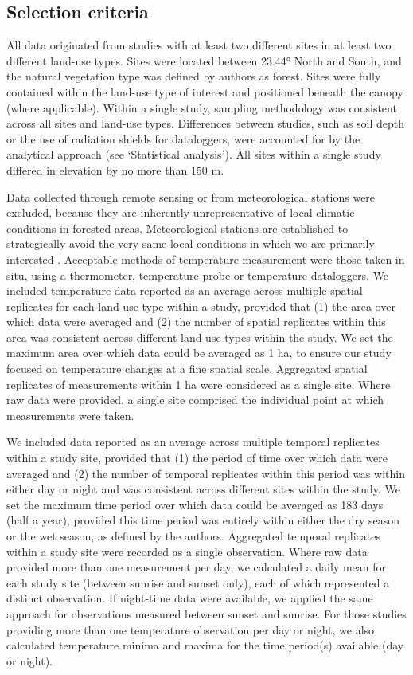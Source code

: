\documentclass[12pt,a4paper,]{report}
\theoremstyle{definition}
\theoremstyle{definition}
\theoremstyle{definition}
\theoremstyle{remark}
\begin{document}
\subsection{Selection criteria}\label{selection-criteria}

All data originated from studies with at least two different sites in at
least two different land-use types. Sites were located between 23.44°
North and South, and the natural vegetation type was defined by authors
as forest. Sites were fully contained within the land-use type of
interest and positioned beneath the canopy (where applicable). Within a
single study, sampling methodology was consistent across all sites and
land-use types. Differences between studies, such as soil depth or the
use of radiation shields for dataloggers, were accounted for by the
analytical approach (see `Statistical analysis'). All sites within a
single study differed in elevation by no more than 150 m.

Data collected through remote sensing or from meteorological stations
were excluded, because they are inherently unrepresentative of local
climatic conditions in forested areas. Meteorological stations are
established to strategically avoid the very same local conditions in
which we are primarily interested \citep{frenne_weather_2016}.
Acceptable methods of temperature measurement were those taken in situ,
using a thermometer, temperature probe or temperature dataloggers. We
included temperature data reported as an average across multiple spatial
replicates for each land-use type within a study, provided that (1) the
area over which data were averaged and (2) the number of spatial
replicates within this area was consistent across different land-use
types within the study. We set the maximum area over which data could be
averaged as 1 ha, to ensure our study focused on temperature changes at
a fine spatial scale. Aggregated spatial replicates of measurements
within 1 ha were considered as a single site. Where raw data were
provided, a single site comprised the individual point at which
measurements were taken.

We included data reported as an average across multiple temporal
replicates within a study site, provided that (1) the period of time
over which data were averaged and (2) the number of temporal replicates
within this period was within either day or night and was consistent
across different sites within the study. We set the maximum time period
over which data could be averaged as 183 days (half a year), provided
this time period was entirely within either the dry season or the wet
season, as defined by the authors. Aggregated temporal replicates within
a study site were recorded as a single observation. Where raw data
provided more than one measurement per day, we calculated a daily mean
for each study site (between sunrise and sunset only), each of which
represented a distinct observation. If night-time data were available,
we applied the same approach for observations measured between sunset
and sunrise. For those studies providing more than one temperature
observation per day or night, we also calculated temperature minima and
maxima for the time period(s) available (day or night).
\end{document}
